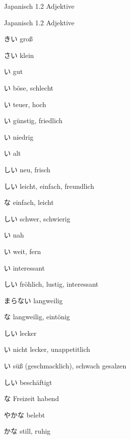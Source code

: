\noindent
\centering
Japanisch 1.2 Adjektive

\begin{multicols*}{2}
\begin{flushleft}
\begin{labeling}{Japanisch 1.2 Adjektive}
	\item [\ruby{大}{おお}きい] groß
	\item [\ruby{小}{ちい}さい] klein
	
	\item [\ruby{良}{い}い] gut
	\item [\ruby{悪}{わる}い] böse, schlecht
	
	\item [\ruby{高}{たか}い] teuer, hoch
	\item [\ruby{安}{やす}い] günstig, friedlich
	\item [\ruby{低}{ひく}い] niedrig
	
	\item [\ruby{古}{ふる}い] alt
	\item [\ruby{新}{あたら}しい] neu, frisch
	
	\item [\ruby{易}{やさ}しい] leicht, einfach, freundlich
	\item [\ruby{簡単}{かんたん}な] einfach, leicht
	\item [\ruby{難}{むずか}しい] schwer, schwierig
	
	\item [\ruby{近}{ちか}い] nah
	\item [\ruby{遠}{とお}い] weit, fern
	
	\item [\ruby{面白}{おもしろ}い] interessant
	\item [\ruby{楽}{たの}しい] fröhlich, lustig, interessant
	\item [\ruby{詰}{つ}まらない] langweilig
	\item [\ruby{退屈}{たいくつ}な] langweilig, eintönig
	
	\item [\ruby{美味}{おい}しい] lecker
	\item [\ruby{不味}{まず}い] nicht lecker, unappetitlich
	\item [\ruby{甘}{あま}い] süß (geschmacklich), schwach gesalzen
	
	\item [\ruby{忙}{いそが}しい] beschäftigt
	\item [\ruby{暇}{ひま}な] Freizeit habend
	
	\item [\ruby{賑}{にぎ}やかな] belebt
	\item [\ruby{静}{しず}かな] still, ruhig
	

\end{labeling}
\end{flushleft}
\end{multicols*}
